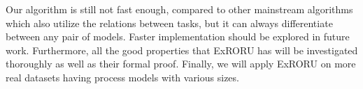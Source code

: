\documentclass{llncs}
\begin{document}
Our algorithm is still not fast enough, compared to other mainstream algorithms which also utilize the relations between tasks, but it can always differentiate between any pair of models. Faster implementation should be explored in future work. Furthermore, all the good properties that ExRORU has will be investigated thoroughly as well as their formal proof. Finally, we will apply ExRORU on more real datasets having process models with various sizes.



\end{document}
